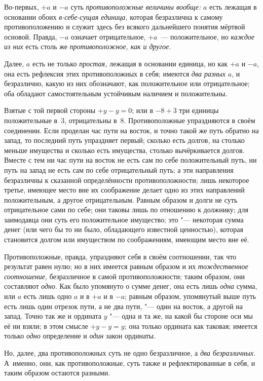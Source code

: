 Во-первых, $+a$ и $-a$ суть {\em противоположные величины вообще:}
$a$ есть лежащая в основании обоих
{\em в-себе-сущая единица,} которая безразлична к
самому противоположению и служит здесь без всякого дальнейшего понятия
мёртвой основой. Правда, $-a$ означает
отрицательное, $+a$~--- положительное, но
{\em каждое из них} есть столь же {\em противоположное, как и другое}.

Далее, $a$ есть не только {\em простая,} лежащая в основании единица, но как
$+a$ и $-a$, она есть рефлексия этих противоположных в себя; имеются {\em два
разных} $a$, и безразлично, какую из них обозначают, как положительное или
отрицательное; оба обладают самостоятельным устойчивым наличием и положительны.

Взятые с той первой стороны $+y-y=0$; или в $-8+3$ три единицы положительные
в~3, отрицательны в~8. Противоположные упраздняются в своём соединении. Если
проделан час пути на восток, и точно такой же путь обратно на запад, то
последний путь упраздняет первый; сколько есть долгов, на столько меньше
имущества и сколько есть имущества, столько вычёркивается долгов. Вместе с
тем ни час пути на восток не есть сам по себе положительный путь, ни путь
на запад не есть сам по себе отрицательный путь; а эти направления
безразличны к сказанной определённости противоположности; лишь некоторое
третье, имеющее место вне их соображение делает одно из этих направлений
положительным, а другое отрицательным. Равным образом и долги не суть
отрицательное сами по себе; они таковы лишь по отношению к должнику; для
заимодавца они суть его положительное имущество; это "--- некоторая сумма
денег (или чего бы то ни было, обладающего известной ценностью), которая
становится долгом или имуществом по соображениям, имеющим место вне её.

Противоположные, правда, упраздняют себя в своём соотношении, так что
результат равен нулю; но в них имеется равным образом и их
{\em тождественное соотношение,} безразличное в самой
противоположности; таким образом, они составляют
{\em одно}. Как было упомянуто о сумме денег, она есть
лишь {\em одна} сумма, или $a$ есть лишь одно $a$ и в $+a$ и в $-a$; равным
образом, упомянутый выше путь есть лишь один отрезок пути, а не два
пути, "--- один на восток, а другой на запад. Точно так же и ордината
$y$ "--- одна и та же, на какой бы стороне оси мы её ни
взяли; в этом смысле $+y-y=y$; она только ордината как таковая;
имеется только {\em одно} определение и {\em один} закон ординаты.

Но, далее, два противоположных суть не одно безразличное, а
{\em два безразличных}. А~именно, они, как противоположные, суть также
и рефлектированные в себя, и таким образом остаются разными.

